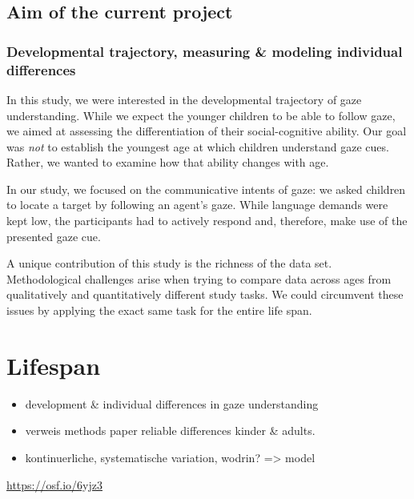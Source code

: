 \documentclass[
  man,floatsintext]{apa6}
\providecommand{\tightlist}{%
  \setlength{\itemsep}{0pt}\setlength{\parskip}{0pt}}
\begin{document}
\hypertarget{aim-of-the-current-project}{%
\subsection{Aim of the current project}\label{aim-of-the-current-project}}

\hypertarget{developmental-trajectory-measuring-modeling-individual-differences}{%
\subsubsection{Developmental trajectory, measuring \& modeling individual differences}\label{developmental-trajectory-measuring-modeling-individual-differences}}

In this study, we were interested in the developmental trajectory of gaze understanding.
While we expect the younger children to be able to follow gaze, we aimed at assessing the differentiation of their social-cognitive ability.
Our goal was \emph{not} to establish the youngest age at which children understand gaze cues.
Rather, we wanted to examine how that ability changes with age.

In our study, we focused on the communicative intents of gaze: we asked children to locate a target by following an agent's gaze.
While language demands were kept low, the participants had to actively respond and, therefore, make use of the presented gaze cue.

A unique contribution of this study is the richness of the data set.
Methodological challenges arise when trying to compare data across ages from qualitatively and quantitatively different study tasks.
We could circumvent these issues by applying the exact same task for the entire life span.

\hypertarget{lifespan}{%
\section{Lifespan}\label{lifespan}}

\begin{itemize}
\tightlist
\item
  development \& individual differences in gaze understanding
\item
  verweis methods paper reliable differences kinder \& adults.
\item
  kontinuerliche, systematische variation, wodrin? =\textgreater{} model
\end{itemize}

\url{https://osf.io/6yjz3}
\end{document}
